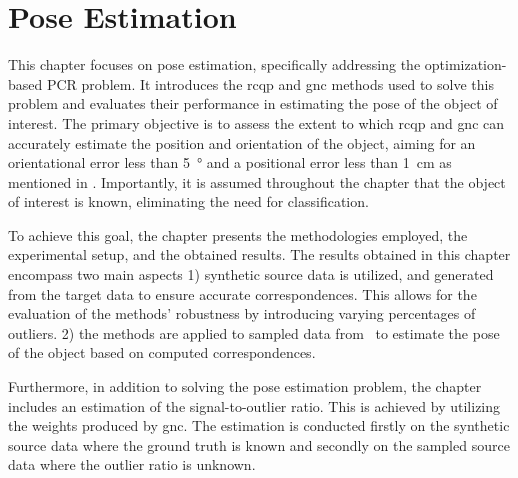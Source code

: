 \chapter{Pose Estimation}\label{ch:2-pose-estimation}

This chapter focuses on pose estimation, specifically addressing the optimization-based PCR problem. It introduces the \gls{rcqp} and \gls{gnc} methods used to solve this problem and evaluates their performance in estimating the pose of the object of interest. The primary objective is to assess the extent to which \gls{rcqp} and \gls{gnc} can accurately estimate the position and orientation of the object, aiming for an orientational error less than \SI{5}{\degree} and a positional error less than \SI{1}{cm} as mentioned in . Importantly, it is assumed throughout the chapter that the object of interest is known, eliminating the need for classification.\medskip

To achieve this goal, the chapter presents the methodologies employed, the experimental setup, and the obtained results. The results obtained in this chapter encompass two main aspects 1) synthetic source data is utilized, and generated from the target data to ensure accurate correspondences. This allows for the evaluation of the methods' robustness by introducing varying percentages of outliers. 2) the methods are applied to sampled data from~ to estimate the pose of the object based on computed correspondences.\medskip

Furthermore, in addition to solving the pose estimation problem, the chapter includes an estimation of the signal-to-outlier ratio. This is achieved by utilizing the weights produced by \gls{gnc}. The estimation is conducted firstly on the synthetic source data where the ground truth is known and secondly on the sampled source data where the outlier ratio is unknown.


